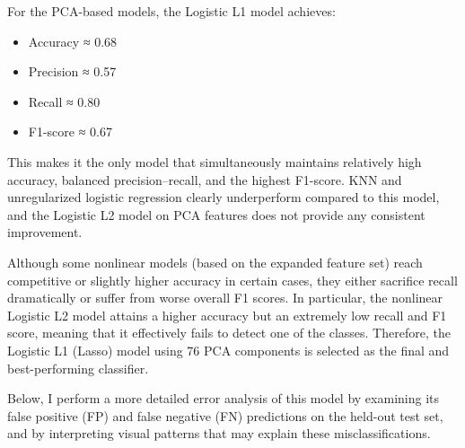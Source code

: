 \documentclass[
]{article}
\providecommand{\tightlist}{%
  \setlength{\itemsep}{0pt}\setlength{\parskip}{0pt}}
\begin{document}
For the PCA-based models, the Logistic L1 model achieves:

\begin{itemize}
\tightlist
\item
  Accuracy ≈ 0.68\\
\item
  Precision ≈ 0.57\\
\item
  Recall ≈ 0.80\\
\item
  F1-score ≈ 0.67
\end{itemize}

This makes it the only model that simultaneously maintains relatively
high accuracy, balanced precision--recall, and the highest F1-score. KNN
and unregularized logistic regression clearly underperform compared to
this model, and the Logistic L2 model on PCA features does not provide
any consistent improvement.

Although some nonlinear models (based on the expanded feature set) reach
competitive or slightly higher accuracy in certain cases, they either
sacrifice recall dramatically or suffer from worse overall F1 scores. In
particular, the nonlinear Logistic L2 model attains a higher accuracy
but an extremely low recall and F1 score, meaning that it effectively
fails to detect one of the classes. Therefore, the Logistic L1 (Lasso)
model using 76 PCA components is selected as the final and
best-performing classifier.

Below, I perform a more detailed error analysis of this model by
examining its false positive (FP) and false negative (FN) predictions on
the held-out test set, and by interpreting visual patterns that may
explain these misclassifications.
\end{document}
